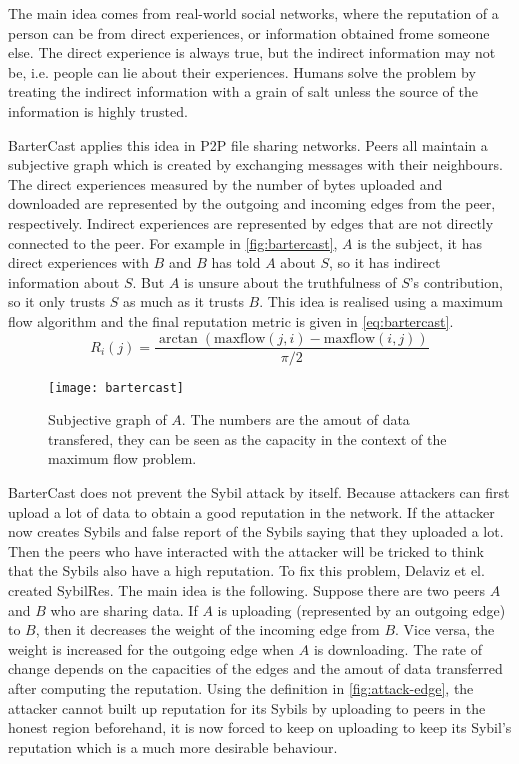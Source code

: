 The main idea comes from real-world social networks, where the reputation of a
person can be from direct experiences, or information obtained frome someone
else. The direct experience is always true, but the indirect information may not
be, i.e. people can lie about their experiences. Humans solve the problem by
treating the indirect information with a grain of salt unless the source of the
information is highly trusted.

BarterCast applies this idea in P2P file sharing networks. Peers all maintain a
subjective graph which is created by exchanging messages with their neighbours.
The direct experiences measured by the number of bytes uploaded and downloaded
are represented by the outgoing and incoming edges from the peer, respectively.
Indirect experiences are represented by edges that are not directly connected to
the peer. For example in \autoref{fig:bartercast}, $A$ is the subject, it has
direct experiences with $B$ and $B$ has told $A$ about $S$, so it has indirect
information about $S$. But $A$ is unsure about the truthfulness of $S$'s
contribution, so it only trusts $S$ as much as it trusts $B$. This idea is
realised using a maximum flow algorithm and the final reputation metric is given
in \autoref{eq:bartercast}.
\begin{equation}\label{eq:bartercast}
  R_i(j) = \frac{\arctan(\text{maxflow}(j, i) - \text{maxflow}(i, j))}{\pi / 2}
\end{equation}

\begin{figure}
  \centering
  \texttt{[image: bartercast]}
  \caption{Subjective graph of $A$. The numbers are the amout of data transfered,
    they can be seen as the capacity in the context of the maximum flow
    problem.}
  \label{fig:bartercast}
\end{figure}

BarterCast does not prevent the Sybil attack by itself. Because attackers can
first upload a lot of data to obtain a good reputation in the network. If the
attacker now creates Sybils and false report of the Sybils saying that they
uploaded a lot. Then the peers who have interacted with the attacker will be
tricked to think that the Sybils also have a high reputation. To fix this
problem, Delaviz et el. created SybilRes\cite{delaviz2012sybilres}. The main
idea is the following. Suppose there are two peers $A$ and $B$ who are sharing
data. If $A$ is uploading (represented by an outgoing edge) to $B$, then it
decreases the weight of the incoming edge from $B$. Vice versa, the weight is
increased for the outgoing edge when $A$ is downloading. The rate of change
depends on the capacities of the edges and the amout of data transferred after
computing the reputation. Using the definition in \autoref{fig:attack-edge}, the
attacker cannot built up reputation for its Sybils by uploading to peers in the
honest region beforehand, it is now forced to keep on uploading to keep its
Sybil's reputation which is a much more desirable behaviour.

